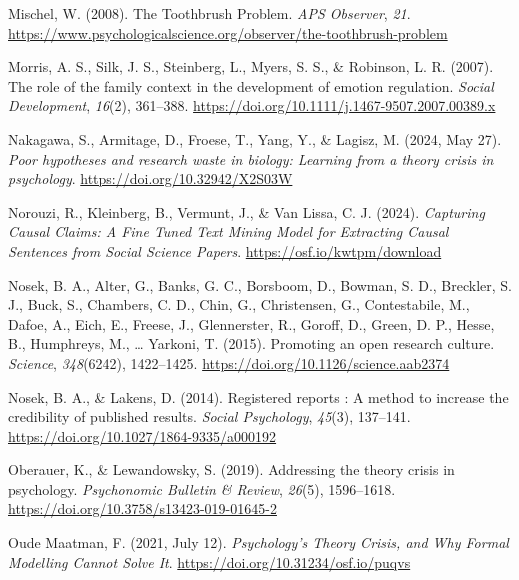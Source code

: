 \documentclass[
  man, noextraspace,floatsintext]{apa7}
\newlength{\cslhangindent}
\newenvironment{CSLReferences}[2] %
 {\begin{list}{}{%
  \setlength{\itemindent}{0pt}
  \setlength{\leftmargin}{0pt}
  \setlength{\parsep}{0pt}
  \ifodd #1
   \setlength{\leftmargin}{\cslhangindent}
   \setlength{\itemindent}{-1\cslhangindent}
  \fi
  \setlength{\itemsep}{#2\baselineskip}}}
 {\end{list}}
\begin{document}
\begin{CSLReferences}{1}{0}
Mischel, W. (2008). The {Toothbrush Problem}. \emph{APS Observer}, \emph{21}. \url{https://www.psychologicalscience.org/observer/the-toothbrush-problem}

Morris, A. S., Silk, J. S., Steinberg, L., Myers, S. S., \& Robinson, L. R. (2007). The role of the family context in the development of emotion regulation. \emph{Social Development}, \emph{16}(2), 361--388. \url{https://doi.org/10.1111/j.1467-9507.2007.00389.x}

Nakagawa, S., Armitage, D., Froese, T., Yang, Y., \& Lagisz, M. (2024, May 27). \emph{Poor hypotheses and research waste in biology: Learning from a theory crisis in psychology}. \url{https://doi.org/10.32942/X2S03W}

Norouzi, R., Kleinberg, B., Vermunt, J., \& Van Lissa, C. J. (2024). \emph{Capturing {Causal Claims}: {A Fine Tuned Text Mining Model} for {Extracting Causal Sentences} from {Social Science Papers}}. \url{https://osf.io/kwtpm/download}

Nosek, B. A., Alter, G., Banks, G. C., Borsboom, D., Bowman, S. D., Breckler, S. J., Buck, S., Chambers, C. D., Chin, G., Christensen, G., Contestabile, M., Dafoe, A., Eich, E., Freese, J., Glennerster, R., Goroff, D., Green, D. P., Hesse, B., Humphreys, M., \ldots{} Yarkoni, T. (2015). Promoting an open research culture. \emph{Science}, \emph{348}(6242), 1422--1425. \url{https://doi.org/10.1126/science.aab2374}

Nosek, B. A., \& Lakens, D. (2014). Registered reports : A method to increase the credibility of published results. \emph{Social Psychology}, \emph{45}(3), 137--141. \url{https://doi.org/10.1027/1864-9335/a000192}

Oberauer, K., \& Lewandowsky, S. (2019). Addressing the theory crisis in psychology. \emph{Psychonomic Bulletin \& Review}, \emph{26}(5), 1596--1618. \url{https://doi.org/10.3758/s13423-019-01645-2}

Oude Maatman, F. (2021, July 12). \emph{Psychology's {Theory Crisis}, and {Why Formal Modelling Cannot Solve It}}. \url{https://doi.org/10.31234/osf.io/puqvs}


\end{CSLReferences}
\end{document}
